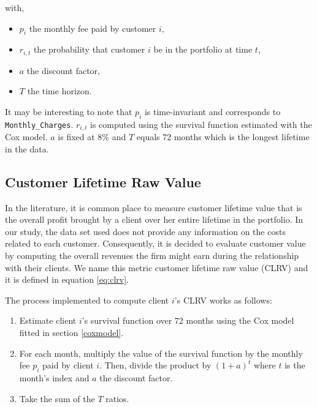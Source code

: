 \documentclass[
]{book}
\providecommand{\tightlist}{%
  \setlength{\itemsep}{0pt}\setlength{\parskip}{0pt}}
\begin{document}
with,

\begin{itemize}
\tightlist
\item
  \(p_i\) the monthly fee paid by customer \(i\),
\item
  \(r_{i,t}\) the probability that customer \(i\) be in the portfolio at time \(t\),
\item
  \(a\) the discount factor,
\item
  \(T\) the time horizon.
\end{itemize}

It may be interesting to note that \(p_i\) is time-invariant and corresponds to \texttt{Monthly\_Charges}. \(r_{i,t}\) is computed using the survival function estimated with the Cox model. \(a\) is fixed at 8\% and \(T\) equals 72 months which is the longest lifetime in the data.

\hypertarget{customer-lifetime-raw-value}{%
\subsection{Customer Lifetime Raw Value}\label{customer-lifetime-raw-value}}

In the literature, it is common place to measure customer lifetime value that is the overall profit brought by a client over her entire lifetime in the portfolio. In our study, the data set used does not provide any information on the costs related to each customer. Consequently, it is decided to evaluate customer value by computing the overall revenues the firm might earn during the relationship with their clients. We name this metric customer lifetime raw value (CLRV) and it is defined in equation \eqref{eq:clrv}.

The process implemented to compute client \(i\)'s CLRV works as follows:

\begin{enumerate}
\def\labelenumi{\arabic{enumi}.}
\tightlist
\item
  Estimate client \(i\)'s survival function over 72 months using the Cox model fitted in section \ref{coxmodel}.
\item
  For each month, multiply the value of the survival function by the monthly fee \(p_i\) paid by client \(i\). Then, divide the product by \((1 + a)^t\) where \(t\) is the month's index and \(a\) the discount factor.
\item
  Take the sum of the \(T\) ratios.
\end{enumerate}
\end{document}
